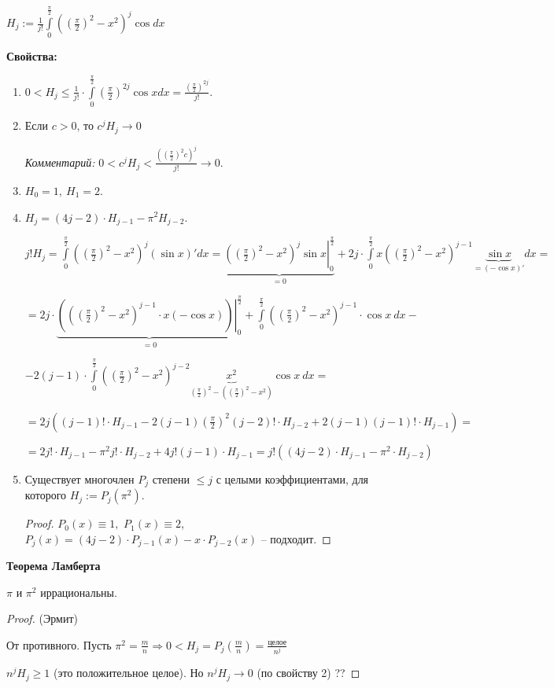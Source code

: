\begin{example}
    $H_j:=\frac{1}{j!}\int\limits_0^{\frac{\pi}{2}}((\frac{\pi}{2})^2-x^2)^j\cos dx$
\end{example}

\begin{statement}
    \textbf{Свойства:}
    \begin{enumerate}
        \item $0<H_j\leq \frac{1}{j!}\cdot \int\limits_0^{\frac{\pi}{2}}(\frac{\pi}{2})^{2j}\cos x dx=\frac{(\frac{\pi}{2})^{2j}}{j!}$.
        \item Если $c>0$, то $c^jH_j\rightarrow 0$
        
        \textit{Комментарий:} $0<c^jH_j<\frac{((\frac{\pi}{2})^2c)^j}{j!}\rightarrow 0$.
        \item $H_0=1,\ H_1=2$.
        \item $H_j=(4j-2)\cdot H_{j-1}-\pi^2H_{j-2}$.

        $j!H_j=\int\limits_0^{\frac{\pi}{2}}((\frac{\pi}{2})^2-x^2)^j(\sin x)'dx=\underbrace{\left.((\frac{\pi}{2})^2-x^2)^j\sin x\right|_0^{\frac{\pi}{2}}}_{=0} 
        +2j\cdot \int\limits_0^{\frac{\pi}{2}} x((\frac{\pi}{2})^2-x^2)^{j-1}\underbrace{\sin x}_{=(-\cos x)'}dx=$
        
        $=2j\cdot \underbrace{\left.(((\frac{\pi}{2})^2-x^2)^{j-1}\cdot x(-\cos x))\right|_0^{\frac{\pi}{2}}}_{=0}+
        \int\limits_0^{\frac{\pi}{2}}((\frac{\pi}{2})^2-x^2)^{j-1} \cdot\cos x\ dx- $
        
        $-2(j-1)\cdot \int\limits_0^{\frac{\pi}{2}}((\frac{\pi}{2})^2-x^2)^{j-2}\underbrace{x^2}_{(\frac{\pi}{2})^2-((\frac{\pi}{2})^2-x^2)}\cos x\ dx=$
        
        $=2j((j-1)!\cdot H_{j-1}-2(j-1)(\frac{\pi}{2})^2(j-2)!\cdot H_{j-2}+2(j-1)(j-1)!\cdot H_{j-1})= $
        
        $=2j!\cdot H_{j-1}-\pi^2 j!\cdot H_{j-2}+4j!(j-1)\cdot H_{j-1}=j!((4j-2)\cdot H_{j-1}-\pi^2\cdot H_{j-2})$
        \item Существует многочлен $P_j$ степени $\leq j$ с целыми коэффициентами, для которого $H_j:=P_j(\pi^2)$.
        \begin{proof}
            $P_0(x)\equiv 1,$ $P_1(x)\equiv 2$, $P_j(x)=(4j-2)\cdot P_{j-1}(x)-x\cdot P_{j-2}(x)$ – подходит.
        \end{proof}
    \end{enumerate}
\end{statement}

\begin{theorem}
    \textbf{Теорема Ламберта}

    $\pi$ и $\pi^2$ иррациональны. 
\end{theorem}

\begin{proof}
    (Эрмит)

    От противного. Пусть $\pi^2=\frac{m}{n}\Rightarrow 0<H_j=P_j(\frac{m}{n})=\frac{\text{целое}}{n^j}$

    $n^jH_j\geq 1$ (это положительное целое). Но $n^jH_j\rightarrow 0$ (по свойству 2) ??
\end{proof}